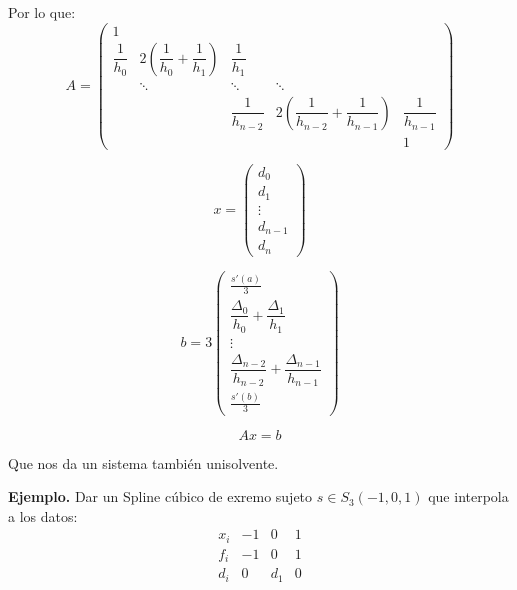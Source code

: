 Por lo que:
$$A=\left( \begin{array}{ccccc}
            1              &                                                 &                    &                                                         &                    \\
            \dfrac{1}{h_0} & 2\left( \dfrac{1}{h_0} + \dfrac{1}{h_1} \right) & \dfrac{1}{h_1}     &                                                         &                    \\
                           & \ddots                                          & \ddots             & \ddots                                                  &                    \\
                           &                                                 & \dfrac{1}{h_{n-2}} & 2\left( \dfrac{1}{h_{n-2}} + \dfrac{1}{h_{n-1}} \right) & \dfrac{1}{h_{n-1}} \\
                           &                                                 &                    &                                                         & 1
        \end{array} \right)$$

$$x=\left( \begin{array}{c}
            d_0     \\
            d_1     \\
            \vdots  \\
            d_{n-1} \\
            d_{n}
        \end{array} \right)$$

$$b=3\left( \begin{array}{c}
            \frac{s'(a)}{3}                                               \\
            \dfrac{\Delta_0}{h_0} + \dfrac{\Delta_1}{h_1}                 \\
            \vdots                                                        \\
            \dfrac{\Delta_{n-2}}{h_{n-2}} + \dfrac{\Delta_{n-1}}{h_{n-1}} \\
            \frac{s'(b)}{3}
        \end{array} \right)$$

$$Ax=b$$

\noindent
Que nos da un sistema también unisolvente.

\bigskip
\noindent
\textbf{Ejemplo.}
Dar un Spline cúbico de exremo sujeto $s \in S_3(-1, 0, 1)$ que interpola a los datos:
$$\begin{array}{c|ccc}
        x_i & -1 & 0   & 1 \\
        \hline
        f_i & -1 & 0   & 1 \\
        \hline
        d_i & 0  & d_1 & 0
    \end{array}$$


